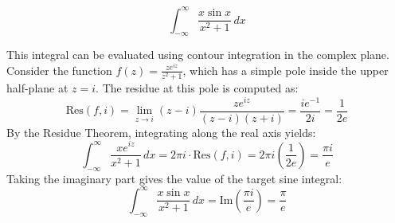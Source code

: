 \begin{questions}
    \question \[ \int_{-\infty}^{\infty} \frac{x\sin x}{x^2+1} \,dx \]
    \begin{solution}
        This integral can be evaluated using contour integration in the complex plane. Consider the function $f(z) = \frac{z e^{iz}}{z^2+1}$, which has a simple pole inside the upper half-plane at $z = i$. The residue at this pole is computed as:
        \[ \text{Res}(f, i) = \lim_{z \to i} (z-i)\frac{z e^{iz}}{(z-i)(z+i)} = \frac{i e^{-1}}{2i} = \frac{1}{2e} \]
        By the Residue Theorem, integrating along the real axis yields:
        \[ \int_{-\infty}^{\infty} \frac{x e^{iz}}{x^2+1} \,dx = 2\pi i \cdot \text{Res}(f, i) = 2\pi i \left(\frac{1}{2e}\right) = \frac{\pi i}{e} \]
        Taking the imaginary part gives the value of the target sine integral:
        \[ \int_{-\infty}^{\infty} \frac{x\sin x}{x^2+1} \,dx = \text{Im}\left(\frac{\pi i}{e}\right) = \frac{\pi}{e} \]
    \end{solution}
\end{questions}

